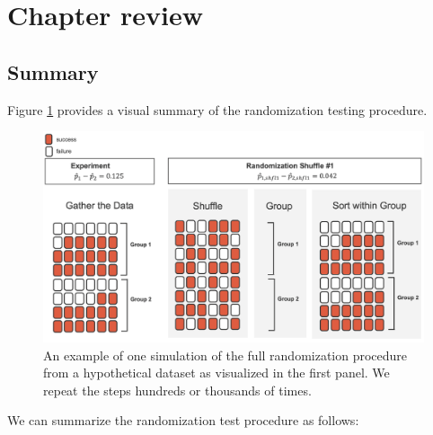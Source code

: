 \documentclass[
  10pt,
  openany]{book}
\begin{document}
\clearpage

\hypertarget{chp11-review}{%
\section{Chapter review}\label{chp11-review}}

\hypertarget{summary-5}{%
\subsection{Summary}\label{summary-5}}

Figure \ref{fig:fullrand} provides a visual summary of the randomization testing procedure.


\begin{figure}[h]

{\centering \includegraphics[width=1\linewidth]{images/fullrand} 

}

\caption{An example of one simulation of the full randomization procedure from a hypothetical dataset as visualized in the first panel.  We repeat the steps hundreds or thousands of times.}\label{fig:fullrand}
\end{figure}

We can summarize the randomization test procedure as follows:
\end{document}
